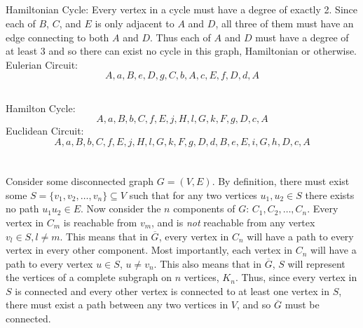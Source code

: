 \documentclass{article}
\begin{document}
\subsection{}
\newline
Hamiltonian Cycle: Every vertex in a cycle must have a degree of exactly 2. Since each of $B$, $C$, and $E$ is only adjacent to $A$ and $D$,
all three of them must have an edge connecting to both $A$ and $D$. Thus each of $A$ and $D$ must have a degree of at least 3 and so there can
exist no cycle in this graph, Hamiltonian or otherwise.\\
Eulerian Circuit:
\[A,a,B,e,D,g,C,b,A,c,E,f,D,d,A\]
\subsection{}
\newline
Hamilton Cycle:
\[A,a,B,b,C,f,E,j,H,l,G,k,F,g,D,c,A\]
Euclidean Circuit:
\[A,a,B,b,C,f,E,j,H,l,G,k,F,g,D,d,B,e,E,i,G,h,D,c,A\]

\section{} %
Consider some disconnected graph $G=(V,E)$. By definition, there must exist some $S=\{v_1,v_2,\ldots,v_n\}\subseteq{V}$ such that for any two
vertices $u_1,u_2\in{S}$ there exists no path $u_{1}u_{2}\in{E}$.
Now consider the $n$ components of $G$: $C_1,C_2,\ldots,C_{n}$. Every vertex in $C_m$ is reachable from $v_m$, and is \textit{not}
reachable from any vertex $v_l\in{S}, l\neq{m}$. This means that in $\overline{G}$, every vertex in ${C_n}$ will have a path to every
vertex in every other component. Most importantly, each vertex in $C_n$ will have a path to every vertex $u\in{S}$, $u\neq{v_n}$.
This also means that in $\overline{G}$, $S$ will represent the vertices of a complete subgraph on $n$ vertices, $K_n$. Thus, since every vertex in
$S$ is connected and every other vertex is connected to at least one vertex in $S$, there must exist a path between any two vertices in $V$, and so
$\overline{G}$ must be connected.
\end{document}
